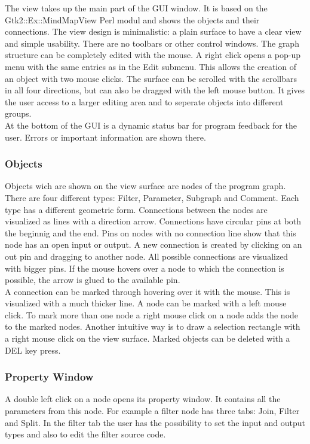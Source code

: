 \documentclass[journal]{IEEEtran}
\begin{document}
The view takes up the main part of the GUI window. It is based on the Gtk2::Ex::MindMapView
Perl modul \cite{GTK2EXMindMapView} and shows the objects and their connections. The view design
is minimalistic: a plain surface to have a clear view and simple usability.
There are no toolbars or other control windows. The graph structure
can be completely edited with the mouse. A right click opens a pop-up menu with the
same entries as in the Edit submenu. This allows the creation of an object with two mouse
clicks. The surface can be scrolled with the scrollbars in all four directions,
but can also be dragged with the left mouse button. It gives the user access to a larger
editing area and to seperate objects into different groups. \\

At the bottom of the GUI is a dynamic status bar for program feedback for the user.
Errors or important information are shown there. \\

\subsubsection{Objects}
Objects wich are shown on the view surface are nodes of the program graph. There
are four different types: Filter, Parameter, Subgraph and Comment. Each type has
a different geometric form. Connections between the nodes are visualized as lines
with a direction arrow. Connections have circular pins at both the beginnig and the end.
Pins on nodes with no connection line show that this node has an open input or output.
A new connection is created by clicking on an out pin and dragging to another node.
All possible connections are visualized with bigger pins. If the mouse hovers over a
node to which the connection is possible, the arrow is glued to the available pin. \\

A connection can be marked through hovering over it with the mouse. This is visualized with a much
thicker line. A node can be marked with a left mouse click. To mark more than one
node a right mouse click on a node adds the node to the marked nodes. Another intuitive
way is to draw a selection rectangle with a right mouse click on the view surface.
Marked objects can be deleted with a DEL key press. \\

\subsubsection{Property Window}
A double left click on a node opens its property window. It contains all the parameters
from this node. For example a filter node has three tabs: Join, Filter and Split.
In the filter tab the user has the possibility to set the input and output types and
also to edit the filter source code.
\end{document}
